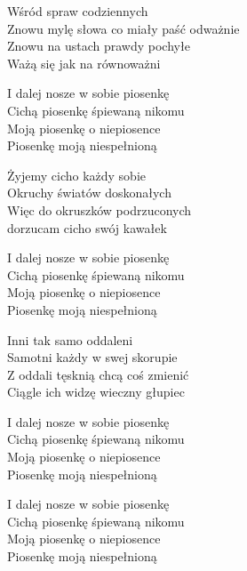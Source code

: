 \begin{text}
    Wśród spraw codziennych\\
    Znowu mylę słowa co miały paść odważnie\\
    Znowu na ustach prawdy pochyłe\\
    Ważą się jak na równoważni

    I dalej nosze w sobie piosenkę\\
    Cichą piosenkę śpiewaną nikomu\\
    Moją piosenkę o niepiosence\\
    Piosenkę moją niespełnioną

    Żyjemy cicho każdy sobie\\
    Okruchy światów doskonałych\\
    Więc do okruszków podrzuconych\\
    dorzucam cicho swój kawałek

    I dalej nosze w sobie piosenkę\\
    Cichą piosenkę śpiewaną nikomu\\
    Moją piosenkę o niepiosence\\
    Piosenkę moją niespełnioną

    Inni tak samo oddaleni\\
    Samotni każdy w swej skorupie\\
    Z oddali tęsknią chcą coś zmienić\\
    Ciągle ich widzę wieczny głupiec

    I dalej nosze w sobie piosenkę\\
    Cichą piosenkę śpiewaną nikomu\\
    Moją piosenkę o niepiosence\\
    Piosenkę moją niespełnioną

    I dalej nosze w sobie piosenkę\\
    Cichą piosenkę śpiewaną nikomu\\
    Moją piosenkę o niepiosence\\
    Piosenkę moją niespełnioną
\end{text}
